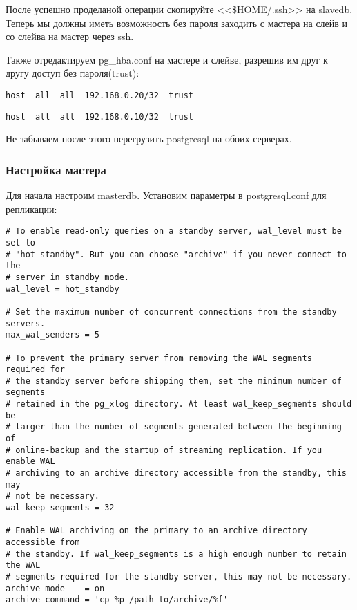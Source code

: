 После успешно проделаной операции скопируйте <<\$HOME/.ssh>> на slavedb. 
Теперь мы должны иметь возможность без пароля заходить с мастера на слейв и со слейва на мастер через ssh.

Также отредактируем pg\_hba.conf на мастере и слейве, разрешив им друг к другу доступ без пароля(trust):
\begin{lstlisting}[label=lst:streaming7,caption=Мастер pg\_hba.conf]
host  all  all  192.168.0.20/32  trust
\end{lstlisting}
\begin{lstlisting}[label=lst:streaming8,caption=Слейв pg\_hba.conf]
host  all  all  192.168.0.10/32  trust
\end{lstlisting}

Не забываем после этого перегрузить postgresql на обоих серверах.

\subsubsection{Настройка мастера}
Для начала настроим masterdb. Установим параметры в postgresql.conf для репликации:
\begin{lstlisting}[label=lst:streaming9,caption=Настройка мастера]
# To enable read-only queries on a standby server, wal_level must be set to
# "hot_standby". But you can choose "archive" if you never connect to the
# server in standby mode.
wal_level = hot_standby

# Set the maximum number of concurrent connections from the standby servers.
max_wal_senders = 5

# To prevent the primary server from removing the WAL segments required for
# the standby server before shipping them, set the minimum number of segments
# retained in the pg_xlog directory. At least wal_keep_segments should be
# larger than the number of segments generated between the beginning of
# online-backup and the startup of streaming replication. If you enable WAL
# archiving to an archive directory accessible from the standby, this may
# not be necessary.
wal_keep_segments = 32

# Enable WAL archiving on the primary to an archive directory accessible from
# the standby. If wal_keep_segments is a high enough number to retain the WAL
# segments required for the standby server, this may not be necessary.
archive_mode    = on
archive_command = 'cp %p /path_to/archive/%f'
\end{lstlisting}

